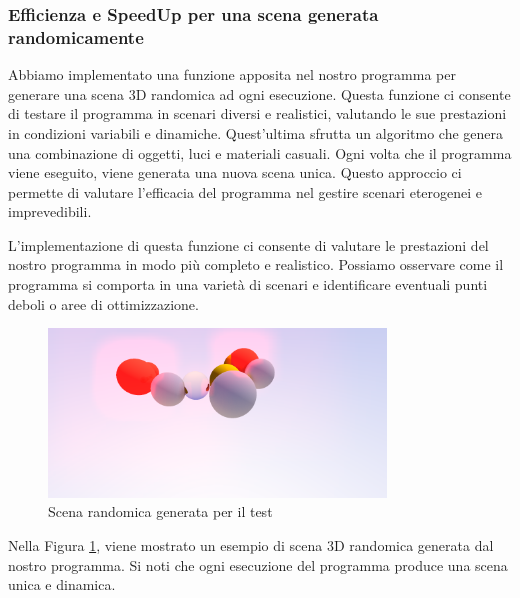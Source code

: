 \documentclass[12pt]{article}
\begin{document}
\subsubsection{Efficienza e SpeedUp per una scena generata randomicamente}
Abbiamo implementato una funzione apposita nel nostro programma per generare una scena 3D randomica ad ogni esecuzione. Questa funzione ci consente di testare il programma in scenari diversi e realistici, valutando le sue prestazioni in condizioni variabili e dinamiche. Quest'ultima sfrutta un algoritmo che genera una combinazione di oggetti, luci e materiali casuali. Ogni volta che il programma viene eseguito, viene generata una nuova scena unica. Questo approccio ci permette di valutare l'efficacia del programma nel gestire scenari eterogenei e imprevedibili.

L'implementazione di questa funzione ci consente di valutare le prestazioni del nostro programma in modo più completo e realistico. Possiamo osservare come il programma si comporta in una varietà di scenari e identificare eventuali punti deboli o aree di ottimizzazione.

\begin{figure}[htbp]
  \centering
  \includegraphics[width=0.8\textwidth]{RandomOutput.png}
  \caption{Scena randomica generata per il test}
  \label{fig:RandomOutput}
\end{figure}

Nella Figura \ref{fig:RandomOutput}, viene mostrato un esempio di scena 3D randomica generata dal nostro programma. Si noti che ogni esecuzione del programma produce una scena unica e dinamica.
\end{document}
